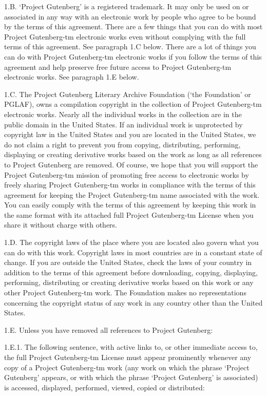 \documentclass[oneside]{book}
\begin{document}
1.B. `Project Gutenberg' is a registered trademark. It may only be
used on or associated in any way with an electronic work by people who
agree to be bound by the terms of this agreement. There are a few
things that you can do with most Project Gutenberg-tm electronic works
even without complying with the full terms of this agreement. See
paragraph 1.C below. There are a lot of things you can do with Project
Gutenberg-tm electronic works if you follow the terms of this
agreement and help preserve free future access to Project Gutenberg-tm
electronic works. See paragraph 1.E below.

1.C. The Project Gutenberg Literary Archive Foundation (`the
Foundation' or PGLAF), owns a compilation copyright in the collection
of Project Gutenberg-tm electronic works. Nearly all the individual
works in the collection are in the public domain in the United
States. If an individual work is unprotected by copyright law in the
United States and you are located in the United States, we do not
claim a right to prevent you from copying, distributing, performing,
displaying or creating derivative works based on the work as long as
all references to Project Gutenberg are removed. Of course, we hope
that you will support the Project Gutenberg-tm mission of promoting
free access to electronic works by freely sharing Project Gutenberg-tm
works in compliance with the terms of this agreement for keeping the
Project Gutenberg-tm name associated with the work. You can easily
comply with the terms of this agreement by keeping this work in the
same format with its attached full Project Gutenberg-tm License when
you share it without charge with others.

1.D. The copyright laws of the place where you are located also govern
what you can do with this work. Copyright laws in most countries are
in a constant state of change. If you are outside the United States,
check the laws of your country in addition to the terms of this
agreement before downloading, copying, displaying, performing,
distributing or creating derivative works based on this work or any
other Project Gutenberg-tm work. The Foundation makes no
representations concerning the copyright status of any work in any
country other than the United States.

1.E. Unless you have removed all references to Project Gutenberg:

1.E.1. The following sentence, with active links to, or other
immediate access to, the full Project Gutenberg-tm License must appear
prominently whenever any copy of a Project Gutenberg-tm work (any work
on which the phrase `Project Gutenberg' appears, or with which the
phrase `Project Gutenberg' is associated) is accessed, displayed,
performed, viewed, copied or distributed:
\end{document}
